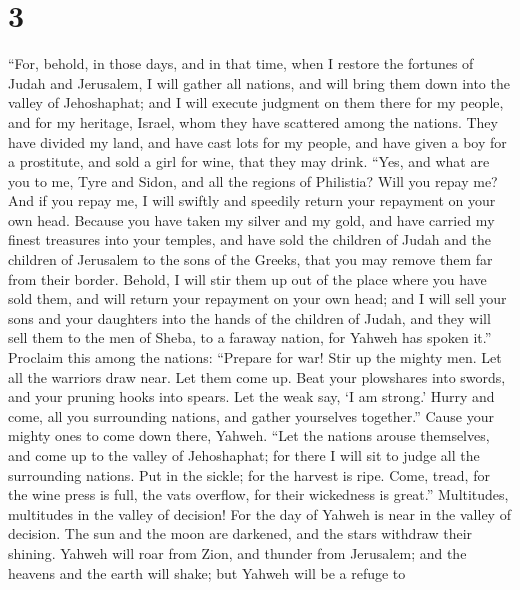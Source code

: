 \hypertarget{section-2}{%
\section{3}\label{section-2}}

 ``For, behold, in those days, and in that time, when I
restore the fortunes of Judah and Jerusalem,  I will
gather all nations, and will bring them down into the valley of
Jehoshaphat; and I will execute judgment on them there for my people,
and for my heritage, Israel, whom they have scattered among the nations.
They have divided my land,  and have cast lots for my
people, and have given a boy for a prostitute, and sold a girl for wine,
that they may drink.  ``Yes, and what are you to me, Tyre
and Sidon, and all the regions of Philistia? Will you repay me? And if
you repay me, I will swiftly and speedily return your repayment on your
own head.  Because you have taken my silver and my gold,
and have carried my finest treasures into your temples, 
and have sold the children of Judah and the children of Jerusalem to the
sons of the Greeks, that you may remove them far from their border.
 Behold, I will stir them up out of the place where you
have sold them, and will return your repayment on your own head;
 and I will sell your sons and your daughters into the
hands of the children of Judah, and they will sell them to the men of
Sheba, to a faraway nation, for Yahweh has spoken it.'' 
Proclaim this among the nations: ``Prepare for war! Stir up the mighty
men. Let all the warriors draw near. Let them come up. 
Beat your plowshares into swords, and your pruning hooks into spears.
Let the weak say, `I am strong.'  Hurry and come, all you
surrounding nations, and gather yourselves together.'' Cause your mighty
ones to come down there, Yahweh.  ``Let the nations
arouse themselves, and come up to the valley of Jehoshaphat; for there I
will sit to judge all the surrounding nations.  Put in
the sickle; for the harvest is ripe. Come, tread, for the wine press is
full, the vats overflow, for their wickedness is great.''
 Multitudes, multitudes in the valley of decision! For
the day of Yahweh is near in the valley of decision.  The
sun and the moon are darkened, and the stars withdraw their shining.
 Yahweh will roar from Zion, and thunder from Jerusalem;
and the heavens and the earth will shake; but Yahweh will be a refuge to
